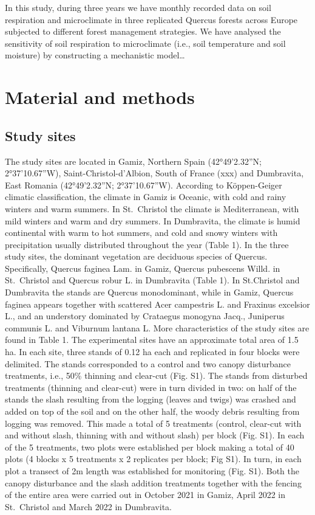 \documentclass[
]{article}
\begin{document}
In this study, during three years we have monthly recorded data on soil respiration and microclimate in three replicated Quercus forests across Europe subjected to different forest management strategies. We have analysed the sensitivity of soil respiration to microclimate (i.e., soil temperature and soil moisture) by constructing a mechanistic model\ldots{}

\section{Material and methods}\label{material-and-methods}

\subsection{Study sites}\label{study-sites}

The study sites are located in Gamiz, Northern Spain (42°49'2.32''N; 2°37'10.67''W), Saint-Christol-d'Albion, South of France (xxx) and Dumbravita, East Romania (42°49'2.32''N; 2°37'10.67''W). According to Köppen-Geiger climatic classification, the climate in Gamiz is Oceanic, with cold and rainy winters and warm summers. In St.~Christol the climate is Mediterranean, with mild winters and warm and dry summers. In Dumbravita, the climate is humid continental with warm to hot summers, and cold and snowy winters with precipitation usually distributed throughout the year (Table 1). In the three study sites, the dominant vegetation are deciduous species of Quercus. Specifically, Quercus faginea Lam. in Gamiz, Quercus pubescens Willd. in St.~Christol and Quercus robur L. in Dumbravita (Table 1). In St.Christol and Dumbravita the stands are Quercus monodominant, while in Gamiz, Quercus faginea appears together with scattered Acer campestris L. and Fraxinus excelsior L., and an understory dominated by Crataegus monogyna Jacq., Juniperus communis L. and Viburnum lantana L. More characteristics of the study sites are found in Table 1.
The experimental sites have an approximate total area of 1.5 ha. In each site, three stands of 0.12 ha each and replicated in four blocks were delimited. The stands corresponded to a control and two canopy disturbance treatments, i.e., 50\% thinning and clear-cut (Fig. S1). The stands from disturbed treatments (thinning and clear-cut) were in turn divided in two: on half of the stands the slash resulting from the logging (leaves and twigs) was crashed and added on top of the soil and on the other half, the woody debris resulting from logging was removed. This made a total of 5 treatments (control, clear-cut with and without slash, thinning with and without slash) per block (Fig. S1). In each of the 5 treatments, two plots were established per block making a total of 40 plots (4 blocks x 5 treatments x 2 replicates per block; Fig S1). In turn, in each plot a transect of 2m length was established for monitoring (Fig. S1). Both the canopy disturbance and the slash addition treatments together with the fencing of the entire area were carried out in October 2021 in Gamiz, April 2022 in St.~Christol and March 2022 in Dumbravita.
\end{document}
